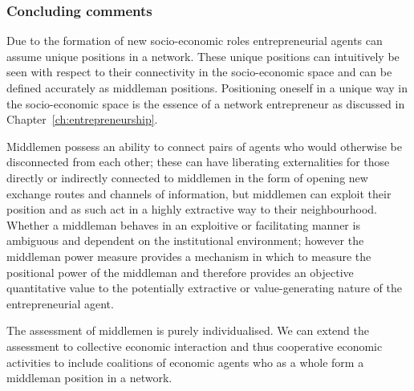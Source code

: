 
\subsubsection{Concluding comments}

Due to the formation of new socio-economic roles entrepreneurial agents can assume unique positions in a network. These unique positions can intuitively be seen with respect to their connectivity in the socio-economic space and can be defined accurately as middleman positions. Positioning oneself in a unique way in the socio-economic space is the essence of a network entrepreneur as discussed in Chapter~\ref{ch:entrepreneurship}. 

Middlemen possess an ability to connect pairs of agents who would otherwise be disconnected from each other; these can have liberating externalities for those directly or indirectly connected to middlemen in the form of opening new exchange routes and channels of information, but middlemen can exploit their position and as such act in a highly extractive way to their neighbourhood. Whether a middleman behaves in an exploitive or facilitating manner is ambiguous and dependent on the institutional environment; however the middleman power measure provides a mechanism in which to measure the positional power of the middleman and therefore provides an objective quantitative value to the potentially extractive or value-generating nature of the entrepreneurial agent.

The assessment of middlemen is purely individualised. We can extend the assessment to collective economic interaction and thus cooperative economic activities to include coalitions of economic agents who as a whole form a middleman position in a network.


